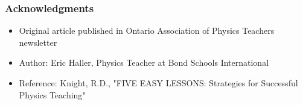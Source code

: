 \documentclass{beamer}
\begin{document}
\begin{frame}
\frametitle{Acknowledgments}
\begin{itemize}
    \item Original article published in Ontario Association of Physics Teachers newsletter
    \item Author: Eric Haller, Physics Teacher at Bond Schools International
    \item Reference: Knight, R.D., "FIVE EASY LESSONS: Strategies for Successful Physics Teaching"
\end{itemize}
\end{frame}
\end{document}
